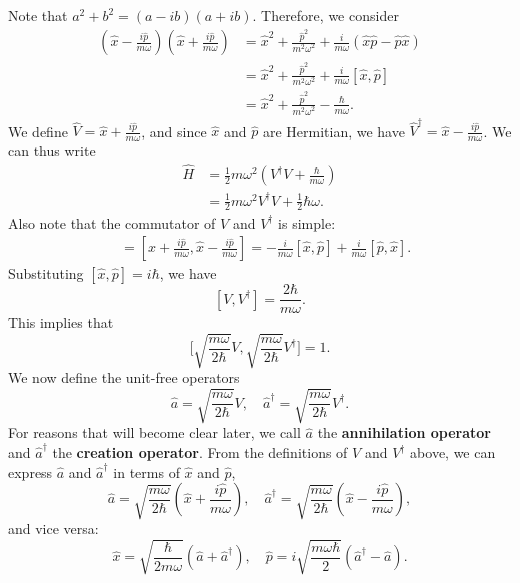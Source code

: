 Note that $a^2+b^2=(a-ib)(a+ib)$. Therefore, we consider \begin{align*}(\hat{x}-\frac{i\hat{p}}{m\omega})(\hat{x}+\frac{i\hat{p}}{m\omega})&=\hat{x}^2+\frac{\hat{p}^2}{m^2\omega^2}+\frac{i}{m\omega}(\hat{x}\hat{p}-\hat{p}\hat{x})\\&=\hat{x}^2+\frac{\hat{p}^2}{m^2\omega^2}+\frac{i}{m\omega}[\hat{x},\hat{p}]\\&=\hat{x}^2+\frac{\hat{p}^2}{m^2\omega^2}-\frac{\hbar}{m\omega}.\end{align*}We define $\hat{V}=\hat{x}+\frac{i\hat{p}}{m\omega}$, and since $\hat{x}$ and $\hat{p}$ are Hermitian, we have $\hat{V}^\dagger=\hat{x}-\frac{i\hat{p}}{m\omega}$. We can thus write \begin{align*}\hat{H}&=\frac{1}{2}m\omega^2(V^\dagger V+\frac{\hbar}{m\omega})\\&=\frac{1}{2}m\omega^2V^\dagger V+\frac{1}{2}\hbar\omega.\end{align*}Also note that the commutator of $V$ and $V^\dagger$ is simple: \begin{align*}[V,V^\dagger]&=[\hat{x}+\frac{i\hat{p}}{m\omega},\hat{x}-\frac{i\hat{p}}{m\omega}]=-\frac{i}{m\omega}[\hat{x},\hat{p}]+\frac{i}{m\omega}[\hat{p},\hat{x}].\end{align*}Substituting $[\hat{x},\hat{p}]=i\hbar$, we have $$[V,V^\dagger]=\frac{2\hbar}{m\omega}.$$This implies that $$\bigg[\sqrt{\frac{m\omega}{2\hbar}}V,\sqrt{\frac{m\omega}{2\hbar}}V^\dagger\bigg]=1.$$We now define the unit-free operators $$\hat{a}=\sqrt{\frac{m\omega}{2\hbar}}V,\quad\hat{a}^\dagger=\sqrt{\frac{m\omega}{2\hbar}}V^\dagger.$$For reasons that will become clear later, we call $\hat{a}$ the \textbf{annihilation operator} and $\hat{a}^\dagger$ the \textbf{creation operator}. From the definitions of $V$ and $V^\dagger$ above, we can express $\hat{a}$ and $\hat{a}^\dagger$ in terms of $\hat{x}$ and $\hat{p}$, 
$$\boxed{\hat{a}=\sqrt{\frac{m\omega}{2\hbar}}(\hat{x}+\frac{i\hat{p}}{m\omega}),\quad\hat{a}^\dagger=\sqrt{\frac{m\omega}{2\hbar}}(\hat{x}-\frac{i\hat{p}}{m\omega}),}$$and vice versa:$$\boxed{\hat{x}=\sqrt{\frac{\hbar}{2m\omega}}(\hat{a}+\hat{a}^\dagger),\quad\hat{p}=i\sqrt{\frac{m\omega\hbar}{2}}(\hat{a}^\dagger-\hat{a}).}$$


